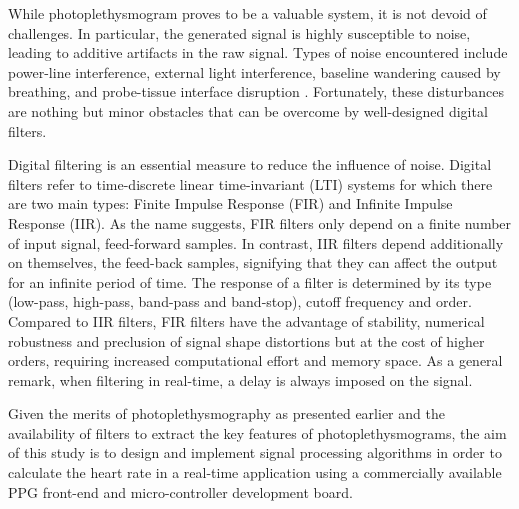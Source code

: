 While photoplethysmogram proves to be a valuable system, it is not devoid of challenges.
In particular, the generated signal is highly susceptible to noise, leading to additive artifacts in the raw signal. Types of noise encountered include power-line interference, external light interference, baseline wandering caused by breathing, and probe-tissue interface disruption \cite{kyriacou_photoplethysmography_2022,elgendi_analysis_2012}. Fortunately, these disturbances are nothing but minor obstacles that can be overcome by well-designed digital filters. 

Digital filtering is an essential measure to reduce the influence of noise. Digital filters refer to time-discrete linear time-invariant (LTI) systems for which there are two main types: Finite Impulse Response (FIR) and Infinite Impulse Response (IIR). As the name suggests, FIR filters only depend on a finite number of input signal, feed-forward samples. In contrast, IIR filters depend additionally on themselves, the feed-back samples, signifying that they can affect the output for an infinite period of time. The response of a filter is determined by its type (low-pass, high-pass, band-pass and band-stop), cutoff frequency and order. Compared to IIR filters, FIR filters have the advantage of stability, numerical robustness and preclusion of signal shape distortions but at the cost of higher orders, requiring increased computational effort and memory space. As a general remark, when filtering in real-time, a delay is always imposed on the signal. \cite{kyriacou_photoplethysmography_2022,noauthor_introduction_nodate}

Given the merits of photoplethysmography as presented earlier and the availability of filters to extract the key features of photoplethysmograms, the aim of this study is to design and implement signal processing algorithms in order to calculate the heart rate in a real-time application using a commercially available PPG front-end and micro-controller development board.









